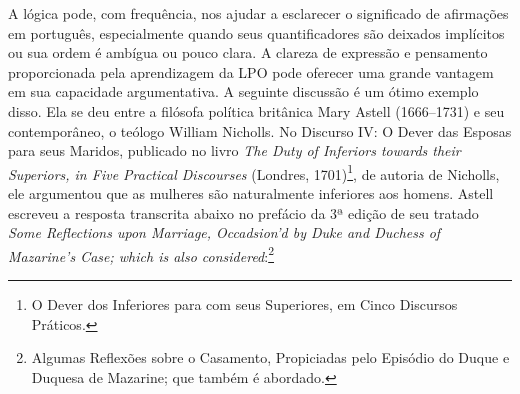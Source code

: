 A lógica pode, com frequência, nos ajudar a esclarecer o significado de afirmações em português, especialmente quando seus quantificadores são deixados implícitos ou sua ordem é ambígua ou pouco clara.
A clareza de expressão e pensamento proporcionada pela aprendizagem da LPO pode oferecer uma grande vantagem em sua capacidade argumentativa.
A seguinte discussão é um ótimo exemplo disso.
Ela se deu entre a filósofa política britânica Mary Astell (1666--1731) e seu contemporâneo, o teólogo William Nicholls.
No Discurso IV: O Dever das Esposas para seus Maridos, publicado no livro \emph{The Duty of Inferiors towards their Superiors, in Five Practical Discourses} (Londres, 1701)\footnote{
	O Dever dos Inferiores para com seus Superiores, em Cinco Discursos Práticos.},
de autoria de Nicholls, ele argumentou que as mulheres são naturalmente inferiores aos homens.
Astell escreveu a resposta transcrita abaixo no prefácio da 3ª edição de seu tratado \emph{Some Reflections upon Marriage, Occadsion'd by Duke and Duchess of Mazarine's Case; which is also considered}:\footnote{
	Algumas Reflexões sobre o Casamento, Propiciadas pelo Episódio do Duque e Duquesa de Mazarine; que também é abordado.}
